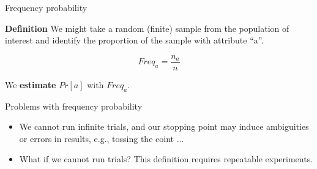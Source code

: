 \documentclass{beamer}
\begin{document}


\begin{frame}
{\centerline{Frequency probability }}
\textbf{Definition} We might take a random (finite) sample from the population of interest and identify the proportion of the sample with attribute ``a''. 
\newline

$$Freq_a = \frac{n_a}{n}$$
\newline

We \textbf{estimate} $Pr[a]$ with $Freq_a$.

\end{frame}



\begin{frame}
{\centerline{Problems with frequency probability}}

\begin{itemize}
\item We cannot run infinite trials, and our stopping point may induce ambiguities or errors in results, e.g., tossing the coint $\ldots{}$ \\
\item What if we cannot run trials? This definition requires repeatable experiments.
\end{itemize}

\end{frame}



\end{document}

